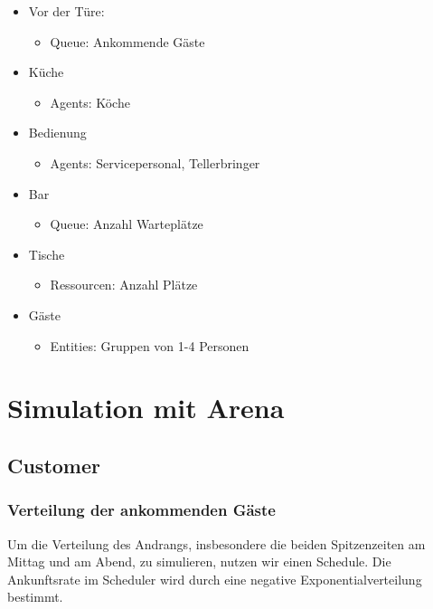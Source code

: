 \documentclass[ngerman,a4paper,12pt]{scrreprt}
\begin{document}
		\begin{itemize}
			\item Vor der Türe:
				\begin{itemize}
					\item Queue: Ankommende Gäste
				\end{itemize}
			\item Küche
				\begin{itemize}
					\item Agents: Köche
				\end{itemize}
			\item Bedienung
				\begin{itemize}
					\item Agents: Servicepersonal, Tellerbringer
				\end{itemize}
			\item Bar
				\begin{itemize}
					\item Queue: Anzahl Warteplätze
				\end{itemize}
			\item Tische
				\begin{itemize}
					\item Ressourcen: Anzahl Plätze
				\end{itemize}
			\item Gäste
				\begin{itemize}
					\item Entities: Gruppen von 1-4 Personen 
				\end{itemize}
	\end{itemize}


\chapter{Simulation mit Arena}
	\section{Customer}			
		\subsection{Verteilung der ankommenden Gäste}
			Um die Verteilung des Andrangs, insbesondere die beiden Spitzenzeiten am Mittag und am Abend, zu simulieren, nutzen wir einen Schedule. Die Ankunftsrate im Scheduler wird durch eine negative Exponentialverteilung bestimmt.
	
\end{document}
